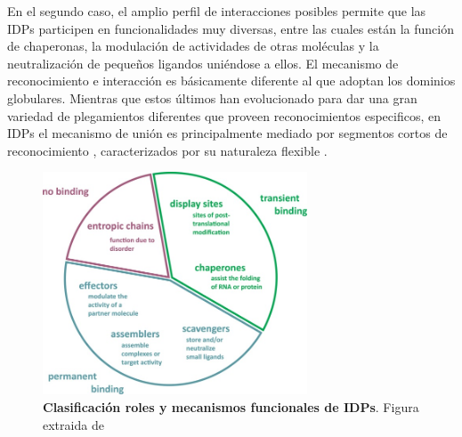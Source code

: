 En el segundo caso, el amplio perfil de interacciones posibles permite que las IDPs participen en funcionalidades muy diversas, entre las cuales están la función de chaperonas, 
la modulación de actividades de otras moléculas y la neutralización de pequeños ligandos uniéndose a ellos.
El mecanismo de reconocimiento e interacción es básicamente diferente al que adoptan los dominios globulares. 
Mientras que estos últimos han evolucionado para dar una gran variedad de plegamientos diferentes que proveen reconocimientos especificos, 
en IDPs el mecanismo de unión es principalmente mediado por segmentos cortos de reconocimiento \cite{neduva2005systematic,fuxreiter2007local}, caracterizados por su naturaleza flexible  \cite{gunasekaran2003extended,dyson2005intrinsically}.%

% 
% 
% 



\begin{figure}[h!,centered]
\centering
\includegraphics[width=0.7\textwidth]{img/idpFunctionMechanisms.jpg} 
\caption{\textbf{Clasificación roles y mecanismos funcionales de IDPs}. Figura extraida de \cite{van2014classification}}
\label{idpFunctions}
\end{figure}



